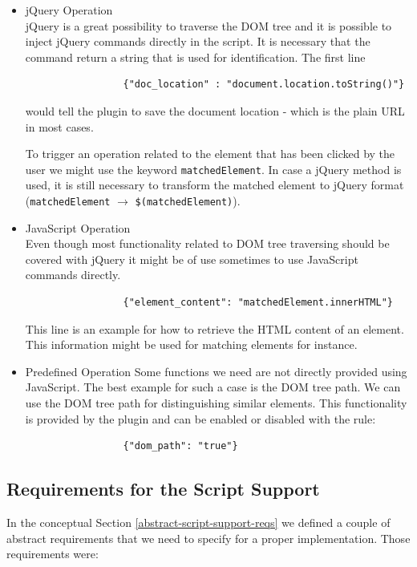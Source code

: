 \begin{itemize}
	\item jQuery Operation \\ 
	jQuery is a great possibility to traverse the DOM tree and it is possible to inject jQuery commands directly in the script. It is necessary that the command return a string that is used for identification. The first line
		\begin{lstlisting}
		         {"doc_location" : "document.location.toString()"}
		\end{lstlisting}
	would tell the plugin to save the document location - which is the plain URL in most cases. 
	
	To trigger an operation related to the element that has been clicked by the user we might use the keyword \verb^matchedElement^. In case a jQuery method is used, it is still necessary to transform the matched element to jQuery format (\verb^matchedElement^ $\rightarrow$ \verb^$(matchedElement)^). 
	
	\item	 JavaScript Operation \\
	Even though most functionality related to DOM tree traversing should be covered with jQuery it might be of use sometimes to use JavaScript commands directly. 
		\begin{lstlisting}
		         {"element_content": "matchedElement.innerHTML"}
		\end{lstlisting}
	This line is an example for how to retrieve the HTML content of an element. This information might be used for matching elements for instance. 
	
	\item Predefined Operation \label{predefined-operation}
	Some functions we need are not directly provided using JavaScript. The best example for such a case is the DOM tree path. We can use the DOM tree path for distinguishing similar elements. This functionality is provided by the plugin and can be enabled or disabled with the rule:
		\begin{lstlisting}
		         {"dom_path": "true"}
		\end{lstlisting}	
\end{itemize}

\subsection{Requirements for the Script Support}

In the conceptual Section \ref{abstract-script-support-reqs} we defined a couple of abstract requirements that we need to specify for a proper implementation. Those requirements were:

